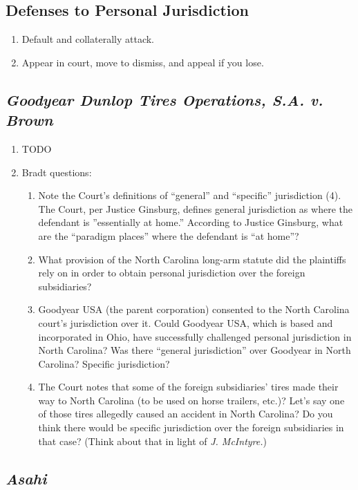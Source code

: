 \subsection{Defenses to Personal Jurisdiction}

\begin{enumerate}
    \item Default and collaterally attack.
    \item Appear in court, move to dismiss, and appeal if you lose.
\end{enumerate}

\subsection{\emph{Goodyear Dunlop Tires Operations, S.A. v. Brown}}

\begin{enumerate}
    \item TODO
    \item Bradt questions:
    \begin{enumerate}
        \item Note the Court's definitions of ``general'' and ``specific'' jurisdiction (4). The Court, per Justice Ginsburg, defines general jurisdiction as where the defendant is ''essentially at home.'' According to Justice Ginsburg, what are the ``paradigm places'' where the defendant is ``at home''?
        \item What provision of the North Carolina long-arm statute did the plaintiffs rely on in order to obtain personal jurisdiction over the foreign subsidiaries?
        \item Goodyear USA (the parent corporation) consented to the North Carolina court's jurisdiction over it. Could Goodyear USA, which is based and incorporated in Ohio, have successfully challenged personal jurisdiction in North Carolina? Was there ``general jurisdiction'' over Goodyear in North Carolina? Specific jurisdiction?
        \item The Court notes that some of the foreign subsidiaries' tires made their way to North Carolina (to be used on horse trailers, etc.)? Let's say one of those tires allegedly caused an accident in North Carolina? Do you think there would be specific jurisdiction over the foreign subsidiaries in that case? (Think about that in light of \emph{J. McIntyre.})
    \end{enumerate}
\end{enumerate}

\subsection{\emph{Asahi}}

